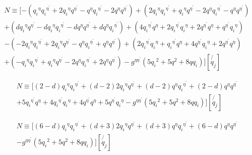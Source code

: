 \begin{equation}
\begin{split}
N\equiv [-({q_i}^{{\eta}}{q_i}^{{\eta}^{\prime}}+2{q_i}^{{\eta}}{q}^{{\eta}^{\prime}}-{q}^{{\eta}}{q_i}^{{\eta}^{\prime}}-2{q}^{{\eta}}{q}^{{\eta}^{\prime}})
+(2{q_i}^{{\eta}}{q_i}^{{\eta}^{\prime}}+{q_i}^{{\eta}}{q}^{{\eta}^{\prime}}-2{q}^{{\eta}}{q_i}^{{\eta}^{\prime}}-{q}^{{\eta}}{q}^{{\eta}^{\prime}})\\+(d{q_i}^{{\eta}}{q}^{{\eta}^{\prime}}-d{q_i}^{{\eta}}{q_i}^{{\eta}^{\prime}}-d{q}^{{\eta}}{q}^{{\eta}^{\prime}}+d{q}^{{\eta}}{q_i}^{{\eta}^{\prime}})+(4{q_i}^{{\eta}^{\prime}}{q}^{{\eta}}+2{q_i}^{{\eta}^{\prime}}{q_i}^{{\eta}}+2{q}^{{\eta}^{\prime}}{q}^{{\eta}}+{q}^{{\eta}^{\prime}}{q_i}^{{\eta}})\\
-(-2{q_i}^{{\eta}}{q_i}^{{\eta}^{\prime}}+2{q_i}^{{\eta}}{q}^{{\eta}^{\prime}}-{q}^{{\eta}}{q_i}^{{\eta}^{\prime}}+{q}^{{\eta}}{q}^{{\eta}^{\prime}})+(2{q_i}^{{\eta}^{\prime}}{q_i}^{{\eta}}+{q_i}^{{\eta}^{\prime}}{q}^{{\eta}}+4{q}^{{\eta}^{\prime}}{q_i}^{{\eta}}+2{q}^{{\eta}^{\prime}}{q}^{{\eta}})\\+(-{q_i}^{{\eta}}{q_i}^{{\eta}^{\prime}}+{q_i}^{{\eta}}{q}^{{\eta}^{\prime}}-2{q}^{{\eta}}{q_i}^{{\eta}^{\prime}}+2{q}^{{\eta}}{q}^{{\eta}^{\prime}})
-g^{{\eta}{{\eta}^{\prime}}}(5{q_i}^2+5{q}^2+8qq_i)][\not{q_j}]
\end{split}
\end{equation}

\begin{equation}
\begin{split}
N\equiv [(2-d){q_i}^{{\eta}}{q_i}^{{\eta}^{\prime}}+(d-2)2{q_i}^{{\eta}}{q}^{{\eta}^{\prime}}+(d-2){q}^{{\eta}}{q_i}^{{\eta}^{\prime}}+(2-d){q}^{{\eta}}{q}^{{\eta}^{\prime}}\\
+5{q_i}^{{\eta}^{\prime}}{q}^{{\eta}}+4{q_i}^{{\eta}^{\prime}}{q_i}^{{\eta}}+4{q}^{{\eta}^{\prime}}{q}^{{\eta}}+5{q}^{{\eta}^{\prime}}{q_i}^{{\eta}}
-g^{{\eta}{{\eta}^{\prime}}}(5{q_i}^2+5{q}^2+8qq_i)][\not{q_j}]
\end{split}
\end{equation}

\begin{equation}
\begin{split}
N\equiv [(6-d){q_i}^{{\eta}}{q_i}^{{\eta}^{\prime}}+(d+3)2{q_i}^{{\eta}}{q}^{{\eta}^{\prime}}+(d+3){q}^{{\eta}}{q_i}^{{\eta}^{\prime}}+(6-d){q}^{{\eta}}{q}^{{\eta}^{\prime}}\\-g^{{\eta}{{\eta}^{\prime}}}(5{q_i}^2+5{q}^2+8qq_i)][\not{q_j}]
\end{split}
\end{equation}


